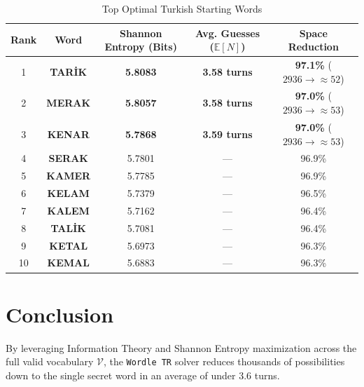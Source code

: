 \documentclass[11pt,a4paper]{article}
\begin{document}
\begin{table}[ht]
\centering
\caption{Top Optimal Turkish Starting Words}
\label{tab:top_starters}
\vspace{4pt}
\begin{tabular}{c c c c c}
\toprule
\textbf{Rank} & \textbf{Word} & \textbf{Shannon Entropy (Bits)} & \textbf{Avg. Guesses ($\mathbb{E}[N]$)} & \textbf{Space Reduction} \\
\midrule
1 & \textbf{TARİK} & \textbf{5.8083} & \textbf{3.58 turns} & \textbf{97.1\%} ($2936 \to \approx 52$) \\
2 & \textbf{MERAK} & \textbf{5.8057} & \textbf{3.58 turns} & \textbf{97.0\%} ($2936 \to \approx 53$) \\
3 & \textbf{KENAR} & \textbf{5.7868} & \textbf{3.59 turns} & \textbf{97.0\%} ($2936 \to \approx 53$) \\
4 & \textbf{SERAK} & 5.7801 & --- & 96.9\% \\
5 & \textbf{KAMER} & 5.7785 & --- & 96.9\% \\
6 & \textbf{KELAM} & 5.7379 & --- & 96.5\% \\
7 & \textbf{KALEM} & 5.7162 & --- & 96.4\% \\
8 & \textbf{TALİK} & 5.7081 & --- & 96.4\% \\
9 & \textbf{KETAL} & 5.6973 & --- & 96.3\% \\
10 & \textbf{KEMAL} & 5.6883 & --- & 96.3\% \\
\bottomrule
\end{tabular}
\end{table}

\section{Conclusion}
By leveraging Information Theory and Shannon Entropy maximization across the full valid vocabulary $\mathcal{V}$, the \texttt{Wordle TR} solver reduces thousands of possibilities down to the single secret word in an average of under 3.6 turns.
\end{document}
